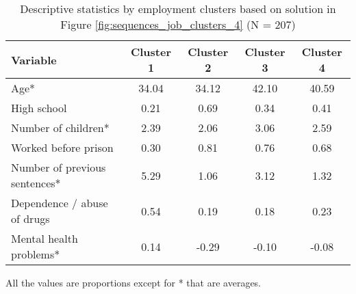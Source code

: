 \begin{table}[htp]
\footnotesize
\setlength{\tabcolsep}{10pt}
\renewcommand{\arraystretch}{1.3}
\begin{threeparttable}
\centering
\caption{Descriptive statistics by employment clusters \newline based on solution in Figure \ref{fig:sequences_job_clusters_4} (N = 207)} 
\label{tab:descriptive_job_clusters_4}
\begin{tabular}{lcccc}
  \hline
Variable & Cluster 1 & Cluster 2 & Cluster 3 & Cluster 4 \\ 
  \hline
Age* & 34.04 & 34.12 & 42.10 & 40.59 \\ 
  High school & 0.21 & 0.69 & 0.34 & 0.41 \\ 
  Number of children* & 2.39 & 2.06 & 3.06 & 2.59 \\ 
  Worked before prison & 0.30 & 0.81 & 0.76 & 0.68 \\ 
  Number of previous sentences* & 5.29 & 1.06 & 3.12 & 1.32 \\ 
  Dependence / abuse of drugs & 0.54 & 0.19 & 0.18 & 0.23 \\ 
  Mental health problems* & 0.14 & -0.29 & -0.10 & -0.08 \\ 
   \hline
\end{tabular}
\begin{tablenotes}
\scriptsize
\item All the values are proportions except for * that are averages.
\end{tablenotes}
\end{threeparttable}
\end{table}
